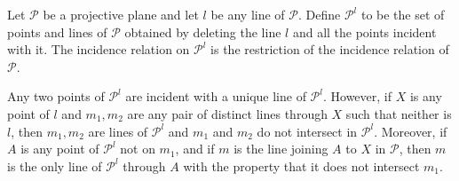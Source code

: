 Let $\mathcal{P}$ be a projective plane and let $l$ be any line of $\mathcal{P}$. Define $\mathcal{P}^l$ to be the set of points and lines of $\mathcal{P}$ obtained by deleting the line $l$ and all the points incident with it. The incidence relation on $\mathcal{P}^l$ is the restriction of the incidence relation of $\mathcal{P}$.

Any two points of $\mathcal{P}^l$ are incident with a unique line of $\mathcal{P}^l$. However, if $X$ is any point of $l$ and $m_1, m_2$ are any pair of distinct lines through $X$ such that neither is $l$, then $m_1, m_2$ are lines of $\mathcal{P}^l$ and $m_1$ and $m_2$ do not intersect in $\mathcal{P}^l$. Moreover, if $A$ is any point of $\mathcal{P}^l$ not on $m_1$, and if $m$ is the line joining $A$ to $X$ in $\mathcal{P}$, then $m$ is the only line of $\mathcal{P}^l$ through $A$ with the property that it does not intersect $m_1$.
